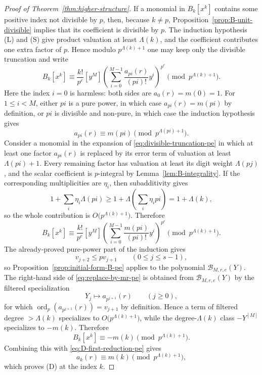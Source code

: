 \documentclass[10pt,a4paper]{amsart}
\newcommand{\bigo}{O}
\DeclareMathOperator{\ordop}{ord}
\newcommand{\vp}{\ordop_p}
\begin{document}
\begin{proof}[Proof of Theorem~\ref{thm:higher-structure}]
If a monomial in $B_k[x^k]$ contains some positive index not divisible by $p$, then, because $k\ne p$, Proposition~\ref{prop:B-unit-divisible} implies that its coefficient is divisible by $p$.  The induction hypothesis (L) and (S) give product valuation at least $\Lambda(k)$, and the coefficient contributes one extra factor of $p$.  Hence modulo $p^{\Lambda(k)+1}$ one may keep only the divisible truncation and write
\begin{equation}\label{eq:divisible-truncation-pe}
        B_k[x^k]\equiv
        \frac{k!}{p^e}[y^M]\left(\sum_{i=0}^{M-1}\frac{a_{pi}(r)}{(pi)!}y^i\right)^{p^e}
        \pmod{p^{\Lambda(k)+1}}.
\end{equation}
Here the index $i=0$ is harmless: both sides are $a_0(r)=m(0)=1$.  For $1\le i<M$, either $pi$ is a pure power, in which case $a_{pi}(r)=m(pi)$ by definition, or $pi$ is divisible and non-pure, in which case the induction hypothesis gives
\[
        a_{pi}(r)\equiv m(pi)\pmod{p^{\Lambda(pi)+1}}.
\]
Consider a monomial in the expansion of \eqref{eq:divisible-truncation-pe} in which at least one factor $a_{pi}(r)$ is replaced by its error term of valuation at least $\Lambda(pi)+1$.  Every remaining factor has valuation at least its digit weight $\Lambda(pj)$, and the scalar coefficient is $p$-integral by Lemma~\ref{lem:B-integrality}.  If the corresponding multiplicities are $\eta_i$, then subadditivity gives
\[
        1+\sum_i \eta_i\Lambda(pi)\ge 1+\Lambda\!\left(\sum_i \eta_i pi\right)=1+\Lambda(k),
\]
so the whole contribution is $\bigo\bigl(p^{\Lambda(k)+1}\bigr)$.  Therefore
\begin{equation}\label{eq:replace-by-mr-pe}
        B_k[x^k]\equiv
        \frac{k!}{p^e}[y^M]\left(\sum_{i=0}^{M-1}\frac{m(pi)}{(pi)!}y^i\right)^{p^e}
        \pmod{p^{\Lambda(k)+1}}.
\end{equation}
The already-proved pure-power part of the induction gives
\[
        v_{j+2}\le pv_{j+1}
        \qquad (0\le j\le s-1),
\]
so Proposition~\ref{prop:initial-form-B-pe} applies to the polynomial $\mathcal B_{M,r,e}(Y)$.  The right-hand side of \eqref{eq:replace-by-mr-pe} is obtained from $\mathcal B_{M,r,e}(Y)$ by the filtered specialization
\[
        Y_j\longmapsto a_{p^{j+1}}(r)
        \qquad (j\ge0),
\]
for which $\vp(a_{p^{j+1}}(r))=v_{j+1}$ by definition.  Hence a term of filtered degree $>\Lambda(k)$ specializes to $\bigo\bigl(p^{\Lambda(k)+1}\bigr)$, while the degree-$\Lambda(k)$ class $-Y^{[M]}$ specializes to $-m(k)$.  Therefore
\[
        B_k[x^k]\equiv -m(k)\pmod{p^{\Lambda(k)+1}}.
\]
Combining this with \eqref{eq:D-first-reduction-pe} gives
\[
        a_k(r)\equiv m(k)\pmod{p^{\Lambda(k)+1}},
\]
which proves (D) at the index $k$.


\end{proof}
\end{document}
